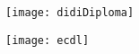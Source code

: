 \documentclass[paper=a4,fontsize=11pt]{scrartcl} %
\newlength{\spacebox}
\newcommand{\sepspace}{\vspace*{1em}}		%
\newcommand{\NewPart}[1]{\section*{\uppercase{#1}}}
\newcommand{\PersonalEntry}[2]{
		\noindent\hangindent=2em\hangafter=0 %
		\parbox{\spacebox}{        %
		\textit{#1}}		       %
		\hspace{1.5em} #2 \par}    %
\newcommand{\SkillsEntry}[2]{      %
		\noindent\hangindent=2em\hangafter=0 %
		\parbox{\spacebox}{        %
		\textit{#1}}			   %
		\hspace{1.5em} \parbox{6\spacebox}{#2} \par}    %
\begin{document}


  \cleardoublepage
  
  \texttt{[image: didiDiploma]}

  \cleardoublepage

  \texttt{[image: ecdl]}
  
\end{document}
